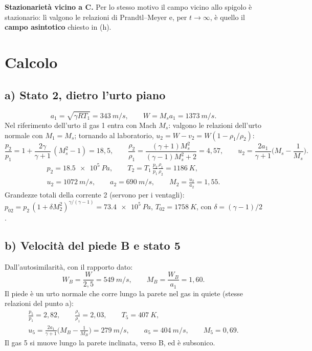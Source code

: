 \documentclass[11pt,a4paper]{article}
\begin{document}
\textbf{Stazionarietà vicino a C.} Per lo stesso motivo il campo vicino allo spigolo è stazionario: lì valgono le
relazioni di Prandtl--Meyer e, per $t\to\infty$, è quello il \textbf{campo asintotico} chiesto in (h).

\section{Calcolo}

\subsection*{a) Stato 2, dietro l'urto piano}
\[
  a_1=\sqrt{\gamma R T_1}=\SI{343}{m/s},\qquad W = M_s a_1 = \SI{1373}{m/s}.
\]
Nel riferimento dell'urto il gas 1 entra con Mach $M_s$: valgono le relazioni dell'urto normale con $M_1=M_s$;
tornando al laboratorio, $u_2 = W - v_2 = W(1-\rho_1/\rho_2)$:
\[
  \frac{p_2}{p_1}=1+\frac{2\gamma}{\gamma+1}\,(M_s^2-1)=18{,}5,\qquad
  \frac{\rho_2}{\rho_1}=\frac{(\gamma+1)M_s^2}{(\gamma-1)M_s^2+2}=4{,}57,\qquad
  u_2=\frac{2a_1}{\gamma+1}\Big(M_s-\frac{1}{M_s}\Big).
\]
\begin{gather*}
  p_2=\SI{18.5e5}{Pa},\qquad T_2=T_1\,\frac{p_2}{p_1}\frac{\rho_1}{\rho_2}=\SI{1186}{K},\\
  u_2=\SI{1072}{m/s},\qquad a_2=\SI{690}{m/s},\qquad M_2=\frac{u_2}{a_2}=1{,}55.
\end{gather*}
Grandezze totali della corrente 2 (servono per i ventagli): $p_{02}=p_2\,(1+\delta M_2^2)^{\gamma/(\gamma-1)}=
\SI{73.4e5}{Pa}$, $T_{02}=\SI{1758}{K}$, con $\delta=(\gamma-1)/2$.

\subsection*{b) Velocità del piede B e stato 5}
Dall'autosimilarità, con il rapporto dato:
\[
  W_B=\frac{W}{2{,}5}=\SI{549}{m/s},\qquad M_B=\frac{W_B}{a_1}=1{,}60 .
\]
Il piede è un urto normale che corre lungo la parete nel gas in quiete (stesse relazioni del punto a):
\begin{gather*}
  \frac{p_5}{p_1}=2{,}82,\qquad \frac{\rho_5}{\rho_1}=2{,}03,\qquad T_5=\SI{407}{K},\\
  u_5=\frac{2a_1}{\gamma+1}\Big(M_B-\frac{1}{M_B}\Big)=\SI{279}{m/s},\qquad a_5=\SI{404}{m/s},\qquad M_5=0{,}69 .
\end{gather*}
Il gas 5 si muove lungo la parete inclinata, verso B, ed è subsonico.
\end{document}
